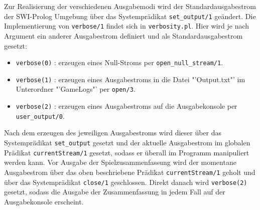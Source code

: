 			Zur Realisierung der verschiedenen Ausgabemodi wird der Standardausgabestrom der SWI-Prolog Umgebung über das Systemprädikat \texttt{set\_output/1} 
			geändert. Die Implementierung von \texttt{verbose/1} findet sich in \texttt{verbosity.pl}. Hier wird je nach Argument ein anderer Ausgabestrom 
			definiert und als Standardausgabestrom gesetzt:
			\begin{itemize}
				\item \texttt{verbose(0)} : erzeugen eines Null-Stroms per \texttt{open\_null\_stream/1}.
				\item \texttt{verbose(1)} : erzeugen eines Ausgabestroms in die Datei "'Output.txt"' im Unterordner "'GameLogs"' per \texttt{open/3}.
				\item \texttt{verbose(2)} : erzeugen eines Ausgabestroms auf die Ausgabekonsole per \texttt{user\_output/0}.
			\end{itemize}
			Nach dem erzeugen des jeweiligen Ausgabestroms wird dieser über das Systemprädikat \texttt{set\_output} gesetzt und der aktuelle Ausgabestrom 
			im globalen Prädikat \texttt{currentStream/1} gesetzt, sodass er überall im Programm manipuliert werden kann.
			Vor Ausgabe der Spielzusammenfassung wird der momentane Ausgabestrom über das oben beschriebene Prädikat \texttt{currentStream/1} geholt und 
			über das Systemprädikat \texttt{close/1} geschlossen. Direkt danach wird \texttt{verbose(2)} gesetzt, sodass die Ausgabe 
			der Zusammenfassung in jedem Fall auf der Ausgabekonsole erscheint.
	


